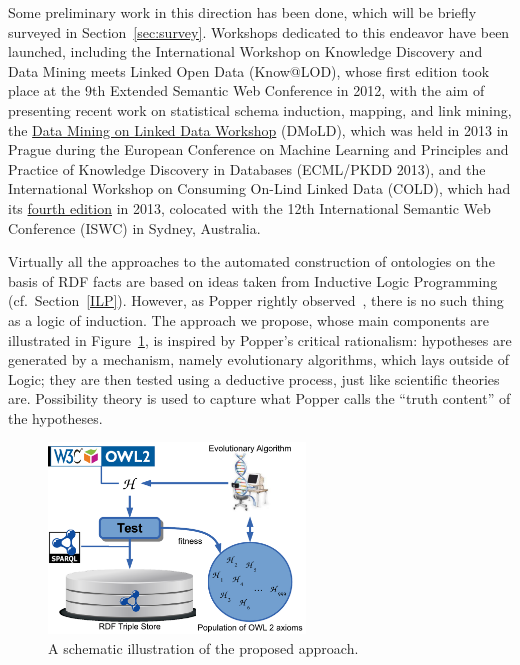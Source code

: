 \documentclass[a4paper]{article}
\begin{document}
Some preliminary work in this direction has been done, which will be briefly surveyed
in Section~\ref{sec:survey}.
Workshops dedicated to this endeavor have been launched, including
the International Workshop on Knowledge Discovery and Data Mining meets Linked Open Data
({Know@LOD}), whose first edition took place at the 9th Extended Semantic Web Conference in 2012,
with the aim of presenting recent work on statistical schema induction, mapping, and link mining,
the \href{http://keg.vse.cz/dmold2013/}{Data Mining on Linked Data Workshop} (DMoLD),
which was held in 2013 in Prague during the European Conference on Machine Learning
and Principles and Practice of Knowledge Discovery in Databases (ECML/PKDD 2013),
and the International Workshop on Consuming On-Lind Linked Data (COLD),
which had its \href{http://db.uwaterloo.ca/cold2013/}{fourth edition} in 2013,
colocated with the 12th International Semantic Web Conference (ISWC) in Sydney, Australia.

Virtually all the approaches to the automated construction of ontologies on the
basis of RDF facts are based on ideas taken from Inductive Logic Programming
(cf.\ Section~\ref{ILP}). However, as Popper rightly observed~\cite{Popper1935},
there is no such thing as a logic of induction. The approach we propose,
whose main components are illustrated in Figure~\ref{fig:synopsis}, is inspired by
Popper's critical rationalism: hypotheses are generated by a mechanism, namely
evolutionary algorithms, which lays outside of Logic; they are then tested using
a deductive process, just like scientific theories are. Possibility theory is used
to capture what Popper calls the ``truth content'' of the hypotheses.

\begin{figure}
  \begin{center}
    \includegraphics[height=2in]{synopsis}
  \end{center}
  \caption{A schematic illustration of the proposed approach.\label{fig:synopsis}}
\end{figure}
\end{document}
